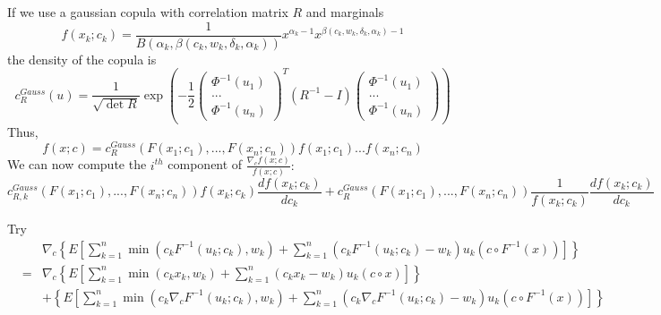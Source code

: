 \documentclass{article}
\begin{document}
If we use a gaussian copula with correlation matrix $R$ and marginals 
\[
f\left( x_{k};c_{k}\right) =\frac{1}{B\left( \alpha _{k},\beta \left(
c_{k},w_{k},\delta _{k},\alpha _{k}\right) \right) }x^{\alpha
_{k}-1}x^{\beta \left( c_{k},w_{k},\delta _{k},\alpha _{k}\right) -1}
\]%
the density of the copula is%
\[
c_{R}^{Gauss}\left( u\right) =\frac{1}{\sqrt{\det R}}\exp \left( -\frac{1}{2}%
\left( 
\begin{array}{c}
\Phi ^{-1}\left( u_{1}\right)  \\ 
... \\ 
\Phi ^{-1}\left( u_{n}\right) 
\end{array}%
\right) ^{T}\left( R^{-1}-I\right) \left( 
\begin{array}{c}
\Phi ^{-1}\left( u_{1}\right)  \\ 
... \\ 
\Phi ^{-1}\left( u_{n}\right) 
\end{array}%
\right) \right) 
\]%
Thus,%
\[
f\left( x;c\right) =c_{R}^{Gauss}\left( F\left( x_{1};c_{1}\right)
,...,F\left( x_{n};c_{n}\right) \right) f\left( x_{1};c_{1}\right)
...f\left( x_{n};c_{n}\right) 
\]%
We can now compute the $i^{th}$ component of $\frac{\nabla _{c}f\left(
x;c\right) }{f\left( x;c\right) }:$ 
\[
c_{R,k}^{Gauss}\left( F\left( x_{1};c_{1}\right) ,...,F\left(
x_{n};c_{n}\right) \right) f\left( x_{k};c_{k}\right) \frac{df\left(
x_{k};c_{k}\right) }{dc_{k}}+c_{R}^{Gauss}\left( F\left( x_{1};c_{1}\right)
,...,F\left( x_{n};c_{n}\right) \right) \frac{1}{f\left( x_{k};c_{k}\right) }%
\frac{df\left( x_{k};c_{k}\right) }{dc_{k}}
\]

\bigskip 

\bigskip 

Try%
\begin{eqnarray*}
&&\nabla _{c}\left\{ E\left[ \sum_{k=1}^{n}\min \left( c_{k}F^{-1}\left(
u_{k};c_{k}\right) ,w_{k}\right) +\sum_{k=1}^{n}\left( c_{k}F^{-1}\left(
u_{k};c_{k}\right) -w_{k}\right) u_{k}\left( c\circ F^{-1}\left( x\right)
\right) \right] \right\}  \\
&=&\nabla _{c}\left\{ E\left[ \sum_{k=1}^{n}\min \left(
c_{k}x_{k},w_{k}\right) +\sum_{k=1}^{n}\left( c_{k}x_{k}-w_{k}\right)
u_{k}\left( c\circ x\right) \right] \right\}  \\
&&+\left\{ E\left[ \sum_{k=1}^{n}\min \left( c_{k}\nabla _{c}F^{-1}\left(
u_{k};c_{k}\right) ,w_{k}\right) +\sum_{k=1}^{n}\left( c_{k}\nabla
_{c}F^{-1}\left( u_{k};c_{k}\right) -w_{k}\right) u_{k}\left( c\circ
F^{-1}\left( x\right) \right) \right] \right\} 
\end{eqnarray*}
\end{document}
